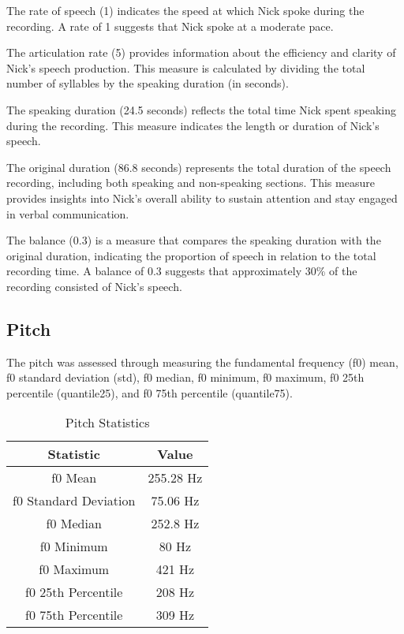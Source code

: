 \documentclass{article}
\begin{document}
The rate of speech (1) indicates the speed at which Nick spoke during the recording. A rate of 1 suggests that Nick spoke at a moderate pace.

The articulation rate (5) provides information about the efficiency and clarity of Nick's speech production. This measure is calculated by dividing the total number of syllables by the speaking duration (in seconds).

The speaking duration (24.5 seconds) reflects the total time Nick spent speaking during the recording. This measure indicates the length or duration of Nick's speech.

The original duration (86.8 seconds) represents the total duration of the speech recording, including both speaking and non-speaking sections. This measure provides insights into Nick's overall ability to sustain attention and stay engaged in verbal communication.

The balance (0.3) is a measure that compares the speaking duration with the original duration, indicating the proportion of speech in relation to the total recording time. A balance of 0.3 suggests that approximately 30\% of the recording consisted of Nick's speech.

\subsection{Pitch}

The pitch was assessed through measuring the fundamental frequency (f0) mean, f0 standard deviation (std), f0 median, f0 minimum, f0 maximum, f0 25th percentile (quantile25), and f0 75th percentile (quantile75).

\begin{table}[H]
\centering
\caption{Pitch Statistics}
\begin{tabular}{|c|c|}
\hline
\textbf{Statistic} & \textbf{Value} \\ \hline
f0 Mean & 255.28 Hz \\ \hline
f0 Standard Deviation & 75.06 Hz \\ \hline
f0 Median & 252.8 Hz \\ \hline
f0 Minimum & 80 Hz \\ \hline
f0 Maximum & 421 Hz \\ \hline
f0 25th Percentile & 208 Hz \\ \hline
f0 75th Percentile & 309 Hz \\ \hline
\end{tabular}
\end{table}
\end{document}
